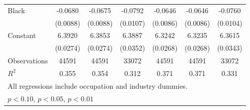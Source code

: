{\begin{longtable}{l*{6}{c}}
Black               &     -0.0680\sym{***}&     -0.0675\sym{***}&     -0.0792\sym{***}&     -0.0646\sym{***}&     -0.0646\sym{***}&     -0.0760\sym{***}\\
                    &    (0.0088)         &    (0.0088)         &    (0.0107)         &    (0.0086)         &    (0.0086)         &    (0.0104)         \\
Constant            &      6.3920\sym{***}&      6.3853\sym{***}&      6.3887\sym{***}&      6.3242\sym{***}&      6.3235\sym{***}&      6.3615\sym{***}\\
                    &    (0.0274)         &    (0.0274)         &    (0.0352)         &    (0.0268)         &    (0.0268)         &    (0.0343)         \\
\hline  
Observations        &       44591         &       44591         &       33072         &       44591         &       44591         &       33072         \\
\(R^{2}\)           &       0.355         &       0.354         &       0.312         &       0.371         &       0.371         &       0.331         \\
\hline  
\multicolumn{7}{l}{\footnotesize All regressions include occupation and industry dummies.}\\
\multicolumn{7}{l}{\footnotesize \sym{*} \(p<0.10\), \sym{**} \(p<0.05\), \sym{***} \(p<0.01\)}\\
\end{longtable}
}
